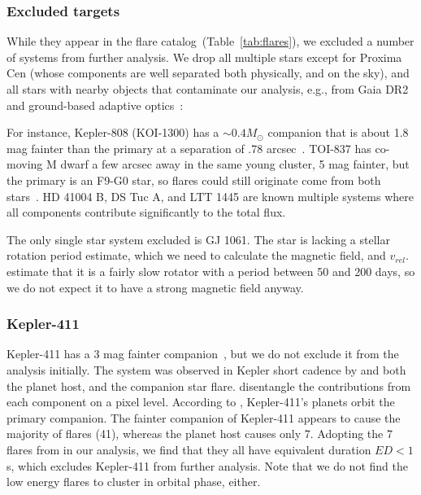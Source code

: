 \documentclass[twocolumn]{aastex631}
\begin{document}
\subsubsection{Excluded targets}
\label{sec:results:individualstars:excluded}

While they appear in the flare catalog~(Table~\ref{tab:flares}), we excluded a number of systems from further analysis. We drop all multiple stars except for Proxima Cen (whose components are well separated both physically, and on the sky), and all stars with nearby objects that contaminate our analysis, e.g., from Gaia DR2 and ground-based adaptive optics~\citep{ziegler2018measuring}: 

For instance, Kepler-808 (KOI-1300) has a $\sim0.4M_\odot$ \citep{kraus2016impact} companion that is about 1.8 mag fainter than the primary at a separation of .78 arcsec~\citep{baranec2016roboao}. TOI-837 has co-moving M dwarf a few arcsec away in the same young cluster, 5 mag fainter, but the primary is an F9-G0 star, so flares could still originate come from both stars~\citep{bouma2020cluster}. HD 41004 B, DS Tuc A, and LTT 1445 are known multiple systems where all components contribute significantly to the total flux.

The only single star system excluded is GJ 1061. The star is lacking a stellar rotation period estimate, which we need to calculate the magnetic field, and $v_{rel}$. \citet{dreizler2020reddots} estimate that it is a fairly slow rotator with a period between 50 and 200 days, so we do not expect it to have a strong magnetic field anyway.

\subsubsection{Kepler-411}
\label{sec:results:individualstars:kep411}
Kepler-411 has a 3 mag fainter companion~\citep{wang2014influence,ziegler2018measuring}, but we do not exclude it from the analysis initially. The system was observed in Kepler short cadence by \citet{jackman2021stellara} and both the planet host, and the companion star flare. \citet{jackman2021stellara} disentangle the contributions from each component on a pixel level. According to \citet{morton2016false, sun2019kepler411}, Kepler-411's planets orbit the primary companion. The fainter companion of Kepler-411 appears to cause the majority of flares (41), whereas the planet host causes only 7. Adopting the 7 flares from \cite{jackman2021stellara} in our analysis, we find that they all have equivalent duration $ED<1\,$s, which excludes Kepler-411 from further analysis. Note that we do not find the low energy flares to cluster in orbital phase, either.
\end{document}
